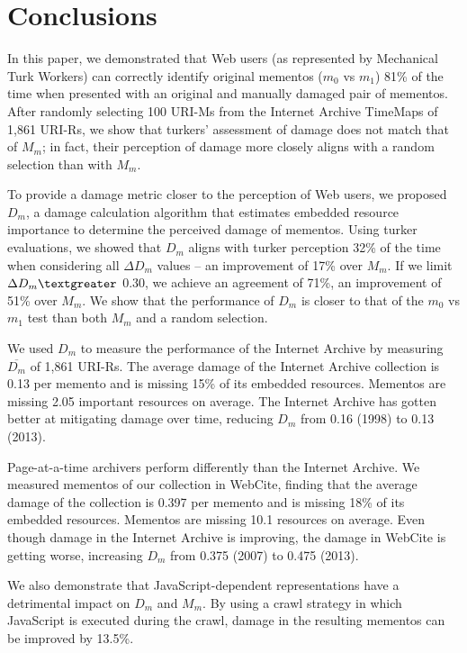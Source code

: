 \section{Conclusions}
\label{conclusion}
In this paper, we demonstrated that Web users (as represented by Mechanical Turk Workers) can correctly identify original mementos ($m_0$ vs $m_1$) 81\% of the time when presented with an original and manually damaged pair of mementos. After randomly selecting 100 URI-Ms from the Internet Archive TimeMaps of 1,861 URI-Rs, we show that turkers' assessment of damage does not match that of $M_m$; in fact, their perception of damage more closely aligns with a random selection than with $M_m$. 

To provide a damage metric closer to the perception of Web users, we proposed $D_m$, a damage calculation algorithm that estimates embedded resource importance to determine the perceived damage of mementos. Using turker evaluations, we showed that $D_m$ aligns with turker perception 32\% of the time when considering all {$\Delta D_m$} values -- an improvement of 17\% over $M_m$. If we limit {$\Delta D_m \textgreater$} 0.30, we achieve an agreement of 71\%, an improvement of 51\% over $M_m$. We show that the performance of $D_m$ is closer to that of the $m_0$ vs $m_1$ test than both $M_m$ and a random selection.

We used $D_m$ to measure the performance of the Internet Archive by measuring $\overline{D_m}$ of 1,861 URI-Rs. The average damage of the Internet Archive collection is 0.13 per memento and is missing 15\% of its embedded resources. Mementos are missing 2.05 important resources on average. The Internet Archive has gotten better at mitigating damage over time, reducing $D_m$ from 0.16 (1998) to 0.13 (2013). 

Page-at-a-time archivers perform differently than the Internet Archive. We measured mementos of our collection in WebCite, finding that the average damage of the collection is 0.397 per memento and is missing 18\% of its embedded resources. Mementos are missing 10.1 resources on average. Even though damage in the Internet Archive is improving, the damage in WebCite is getting worse, increasing $D_m$ from 0.375 (2007) to 0.475 (2013). 

We also demonstrate that JavaScript-dependent representations have a detrimental impact on $D_m$ and $M_m$. By using a crawl strategy in which JavaScript is executed during the crawl, damage in the resulting mementos can be improved by 13.5\%.

